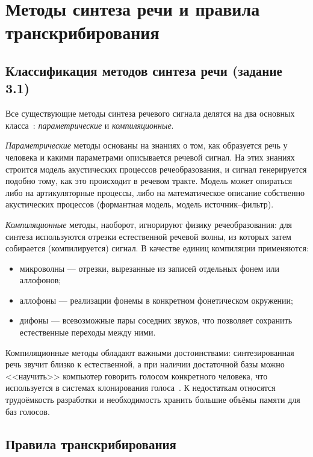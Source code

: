 \section{Методы синтеза речи и правила транскрибирования}

\subsection{Классификация методов синтеза речи (задание 3.1)}

Все существующие методы синтеза речевого сигнала делятся на два основных
класса~\cite{lobanov}: \emph{параметрические} и \emph{компиляционные}.

\emph{Параметрические} методы основаны на знаниях о том, как образуется
речь у человека и какими параметрами описывается речевой сигнал. На этих
знаниях строится модель акустических процессов речеобразования, и сигнал
генерируется подобно тому, как это происходит в речевом тракте. Модель
может опираться либо на артикуляторные процессы, либо на математическое
описание собственно акустических процессов (формантная модель, модель
источник--фильтр).

\emph{Компиляционные} методы, наоборот, игнорируют физику речеобразования:
для синтеза используются отрезки естественной речевой волны, из которых
затем собирается (компилируется) сигнал. В качестве единиц компиляции
применяются:
\begin{itemize}
	\item микроволны --- отрезки, вырезанные из записей отдельных фонем или
	аллофонов;
	\item аллофоны --- реализации фонемы в конкретном фонетическом
	окружении;
	\item дифоны --- всевозможные пары соседних звуков, что позволяет
	сохранить естественные переходы между ними.
\end{itemize}

Компиляционные методы обладают важными достоинствами: синтезированная
речь звучит близко к естественной, а при наличии достаточной базы можно
<<научить>> компьютер говорить голосом конкретного человека, что
используется в системах клонирования голоса~\cite{lobanov,cloning}. К
недостаткам относятся трудоёмкость разработки и необходимость хранить
большие объёмы памяти для баз голосов.

\subsection{Правила транскрибирования}

